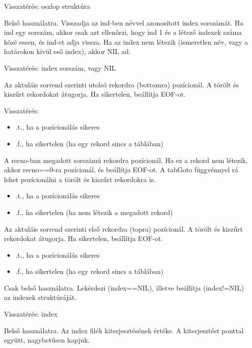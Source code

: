Visszatérés: oszlop struktúra
 
Belső használatra. Visszadja az ind-ben névvel azonosított
index sorszámát. Ha ind egy sorszám, akkor csak azt ellenőrzi,
hogy ind 1 és a létező indexek száma közé essen, és ind-et adja
vissza. Ha az index nem létezik (ismeretlen név, vagy a határokon
kívül eső index), akkor NIL ad.

Visszatérés: index sorszám, vagy NIL


Az aktuláis sorrend szerinti utolsó rekordra (bottomra) pozícionál.
A törölt és kiszűrt rekordokat átugorja.
Ha sikertelen, beállítja EOF-ot.

Visszatérés:
\begin{itemize}
\item .t., ha a pozícionálás sikeres
\item .f., ha sikertelen (ha egy rekord sincs a táblában)
\end{itemize}


A recno-ban megadott sorszámú  rekordra pozícionál.
Ha ez a rekord nem létezik, akkor recno==0-ra
pozícionál, és beállítja EOF-ot. A tabGoto függvénnyel
rá lehet pozícionálni a törölt és kiszűrt rekordokra is.

\begin{itemize}
\item .t., ha a pozícionálás sikeres
\item .f., ha sikertelen (ha nem létezik a megadott rekord)
\end{itemize}


Az aktuláis sorrend szerinti első rekordra (topra) pozícionál.
A törölt és kiszűrt rekordokat átugorja. 
Ha sikertelen, beállítja EOF-ot.

\begin{itemize}
\item .t., ha a pozícionálás sikeres
\item .f., ha sikertelen (ha egy rekord sincs a táblában)
\end{itemize}
 
 
Csak belső használatra. Lekérdezi (index==NIL), 
illetve beállítja (index!=NIL) az indexek struktúráját.

Visszatérés: index


Belső használatra. 
Az index filék kiterjesztésének értéke.
A kiterjesztést ponttal együtt, nagybetűsen kapjuk.

